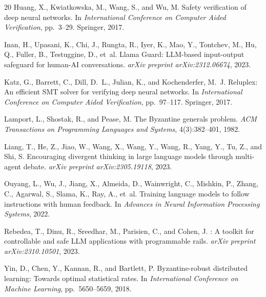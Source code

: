 \documentclass[11pt,a4paper]{article}
\begin{document}
\begin{thebibliography}{20}
Huang, X., Kwiatkowska, M., Wang, S., and Wu, M.
\newblock Safety verification of deep neural networks.
\newblock In \emph{International Conference on Computer Aided Verification},
pp.~3--29. Springer, 2017.

Inan, H., Upasani, K., Chi, J., Rungta, R., Iyer, K., Mao, Y.,
Tontchev, M., Hu, Q., Fuller, B., Testuggine, D., et~al.
\newblock Llama {G}uard: {LLM}-based input-output safeguard for
human-{AI} conversations.
\newblock \emph{arXiv preprint arXiv:2312.06674}, 2023.

Katz, G., Barrett, C., Dill, D.~L., Julian, K., and Kochenderfer, M.~J.
\newblock Reluplex: An efficient {SMT} solver for verifying deep neural
networks.
\newblock In \emph{International Conference on Computer Aided Verification},
pp.~97--117. Springer, 2017.

Lamport, L., Shostak, R., and Pease, M.
\newblock The {B}yzantine generals problem.
\newblock \emph{ACM Transactions on Programming Languages and Systems},
4(3):382--401, 1982.

Liang, T., He, Z., Jiao, W., Wang, X., Wang, Y., Wang, R., Yang, Y.,
Tu, Z., and Shi, S.
\newblock Encouraging divergent thinking in large language models through
multi-agent debate.
\newblock \emph{arXiv preprint arXiv:2305.19118}, 2023.

Ouyang, L., Wu, J., Jiang, X., Almeida, D., Wainwright, C., Mishkin, P.,
Zhang, C., Agarwal, S., Slama, K., Ray, A., et~al.
\newblock Training language models to follow instructions with human
feedback.
\newblock In \emph{Advances in Neural Information Processing Systems},
2022.

Rebedea, T., Dinu, R., Sreedhar, M., Parisien, C., and Cohen, J.
: A toolkit for controllable and safe {LLM}
applications with programmable rails.
\newblock \emph{arXiv preprint arXiv:2310.10501}, 2023.

Yin, D., Chen, Y., Kannan, R., and Bartlett, P.
\newblock Byzantine-robust distributed learning: Towards optimal
statistical rates.
\newblock In \emph{International Conference on Machine Learning},
pp.~5650--5659, 2018.

\end{thebibliography}
\end{document}
